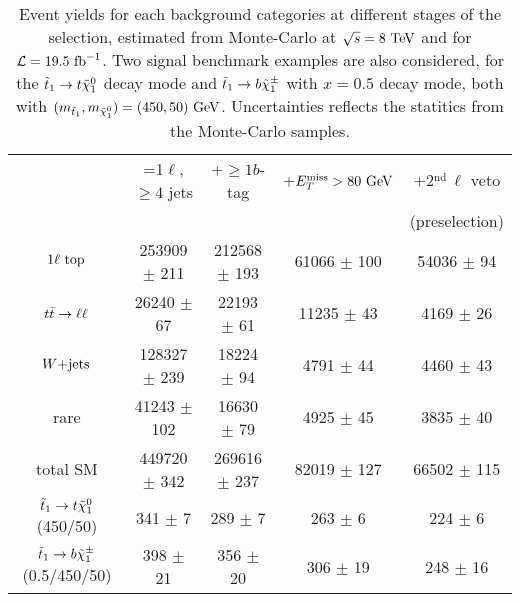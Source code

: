     \begin{table}[h!]
        \hspace*{-0.3cm}
        \begin{tabular}{|c|cccc|}
            \hline
                                         & =1$\ell$, $\geq 4$ jets   & +$\geq 1b$-tag     & +$E_T^\text{miss} > 80 ~\text{GeV}$ &  +2$^\text{nd}\, \ell$ veto \\
                                         &                           &                    &                   & (preselection) \\
            \hline
            $1\ell~\text{top}$              & 253909 $\pm$ 211          & 212568 $\pm$ 193   &  61066 $\pm$ 100  & 54036 $\pm$ 94     \\
            $t\bar{t} \rightarrow \ell \ell$               &  26240 $\pm$ 67           &  22193 $\pm$ 61    &  11235 $\pm$ 43   &  4169 $\pm$ 26     \\
            $\text{$W$+jets}$                     & 128327 $\pm$ 239          &  18224 $\pm$ 94    &   4791 $\pm$ 44   &  4460 $\pm$ 43     \\
            rare                         &  41243 $\pm$ 102          &  16630 $\pm$ 79    &   4925 $\pm$ 45   &  3835 $\pm$ 40     \\
            \hline
            total SM                     & 449720 $\pm$ 342          & 269616 $\pm$ 237   &  82019 $\pm$ 127  & 66502 $\pm$ 115    \\
            \hline
$\tilde{t}_1 \rightarrow t \tilde{\chi}_1^0$   (450/50) & 341 $\pm$ 7               & 289 $\pm$ 7        & 263 $\pm$ 6       & 224 $\pm$ 6        \\
$\tilde{t}_1 \rightarrow b \tilde{\chi}_1^\pm$ (0.5/450/50) & 398 $\pm$ 21              & 356 $\pm$ 20       & 306 $\pm$ 19      & 248 $\pm$ 16       \\
            \hline
        \end{tabular}
        \caption{Event yields for each background categories at different stages
        of the selection, estimated from Monte-Carlo at $\sqrt{s} = 8~\text{TeV}$ and
        for $\mathcal{L} = 19.5~\text{fb}^{-1}$. Two signal benchmark examples are also
        considered, for the $\tilde{t}_1 \rightarrow t \tilde{\chi}_1^0$ decay mode and
        $\tilde{t}_1 \rightarrow b \tilde{\chi}_1^\pm$ with $x = 0.5$ decay mode, both with
        $(m_{\tilde{t}_1},m_{\tilde{\chi}_1^0}) = (450,50)~\text{GeV}$.  Uncertainties
        reflects the statitics from the Monte-Carlo samples.}
        \label{tab:cutflowPreselection}
    \end{table}

